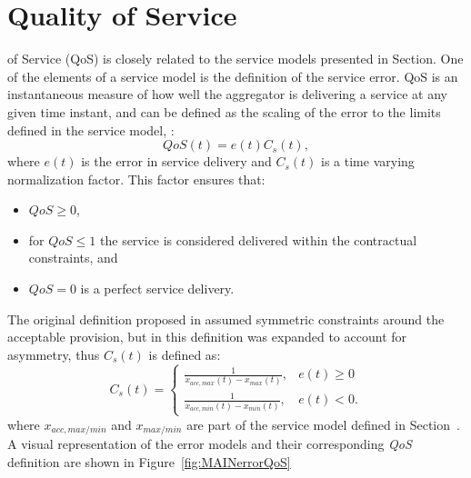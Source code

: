 \section{Quality of Service}\label{sec:MAINQoS}
 of Service (QoS) is closely related to the service models presented in Section. One of the elements of a service model is the definition of the service error. QoS is an instantaneous measure of how well the aggregator is delivering a service at any given time instant, and can be defined as the scaling of the error to the limits defined in the service model, \ie:
\begin{equation}
	QoS(t) = e(t)C_s(t),
\end{equation}
where $e(t)$ is the error in service delivery and $C_s(t)$ is a time varying normalization factor. This factor ensures that:
\begin{itemize}
	\item $QoS \geq 0$,
	\item for $QoS \leq 1$ the service is considered delivered within the contractual constraints, and
	\item $QoS = 0$ is a perfect service delivery.
\end{itemize}

The original definition proposed in \cite{bondy2014performance} assumed symmetric constraints around the acceptable provision, but in \cite{bondy2016method} this definition was expanded to account for asymmetry, thus $C_s(t)$ is defined as:
\begin{equation}
C_{s}(t) = 
\begin{cases}
\frac{1}{x_{acc,max}(t) - x_{max}(t)}, & e(t) \geq 0 \\
\frac{1}{x_{acc,min}(t) - x_{min}(t)}, & e(t) < 0.
\end{cases}\label{eq:MAINcst}
\end{equation}
where $x_{acc,max/min}$ and $x_{max/min}$ are part of the service model defined in Section~. A visual representation of the error models and their corresponding \emph{QoS} definition are shown in Figure~\ref{fig:MAINerrorQoS}

